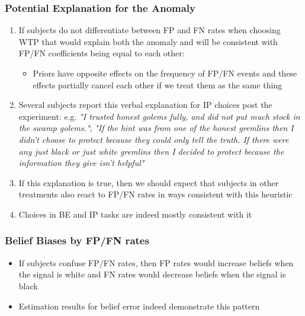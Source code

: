\documentclass[11pt,hyperref={bookmarks=false}]{beamer}
\begin{document}
\begin{frame}
\frametitle{Potential Explanation for the Anomaly}
\begin{enumerate}
\item If subjects do not differentiate between FP and FN rates when choosing WTP that would explain both the anomaly and will be consistent with FP/FN coefficients being equal to each other:
\begin{itemize}
\item Priors have opposite effects on the frequency of FP/FN events and these effects partially cancel each other if we treat them as the same thing
\end{itemize}
\item Several subjects report this verbal explanation for IP choices post the experiment: e.g. \textit{"I trusted honest golems fully, and did not put much stock in the swamp golems."}; \textit{"If the hint was from one of the honest gremlins then I didn't choose to protect because they could only tell the truth. If there were any just black or just white gremlins then I decided to protect because the information they give isn't helpful"}
\item If this explanation is true, then we should expect that subjects in other treatments also react to FP/FN rates in ways consistent with this heuristic
\item Choices in BE and IP tasks are indeed mostly consistent with it
\end{enumerate}
\end{frame}



\begin{frame}
\frametitle{Belief Biases by FP/FN rates}
\begin{itemize}
\item If subjects confuse FP/FN rates, then FP rates would increase beliefs when the signal is white and FN rates would decrease beliefs when the signal is black
\item Estimation results for belief error indeed demonstrate this pattern
\end{itemize}
\scriptsize

\end{frame}
\end{document}
